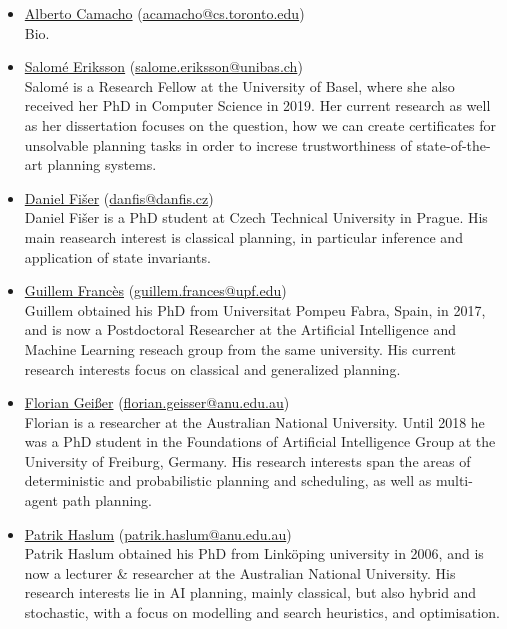 \documentclass[10pt]{article}
\begin{document}
\begin{itemize}

\item \href{http://}{Alberto Camacho}
(\href{mailto:acamacho@cs.toronto.edu}{acamacho@cs.toronto.edu})\\
Bio.

\item \href{http://}{Salom\'{e} Eriksson}
(\href{mailto:salome.eriksson@unibas.ch}{salome.eriksson@unibas.ch})\\
Salom\'{e} is a Research Fellow at the University of Basel, where she also received
her PhD in Computer Science in 2019. Her current research as well as her
dissertation focuses on the question, how we can create certificates for
unsolvable planning tasks in order to increse trustworthiness of
state-of-the-art planning systems.

\item \href{http://}{Daniel Fi\v{s}er}
(\href{mailto:danfis@danfis.cz}{danfis@danfis.cz})\\
Daniel Fi\v{s}er is a PhD student at Czech Technical University in Prague.
His main reasearch interest is classical planning, in particular inference and
application of state invariants.

\item \href{https://www.upf.edu/web/ai-ml/entry/-/-/31934/adscripcion/guillem-franc%C3%A8s}{Guillem Franc\`{e}s}
    (\href{mailto:guillem.frances@upf.edu}{guillem.frances@upf.edu})\\
Guillem obtained his PhD from Universitat Pompeu Fabra, Spain, in 2017, and 
is now a Postdoctoral Researcher at the Artificial Intelligence and Machine
Learning reseach group from the same university.
His current research interests focus on classical and generalized planning.

\item \href{https://cecs.anu.edu.au/people/florian-geisser}{Florian Gei{\ss}er}
(\href{mailto:florian.geisser@anu.edu.au}{florian.geisser@anu.edu.au})\\
Florian is a researcher at the Australian National University. Until 2018 he was
a PhD student in the Foundations of Artificial Intelligence Group at the
University of Freiburg, Germany. His research interests span the areas of
deterministic and probabilistic planning and scheduling, as well as
multi-agent path planning.

\item \href{https://users.cecs.anu.edu.au/~patrik/}{Patrik Haslum}
(\href{mailto:patrik.haslum@anu.edu.au}{patrik.haslum@anu.edu.au})\\
Patrik Haslum obtained his PhD from Link\"oping university in 2006,
and is now a lecturer \& researcher at the Australian National
University. His research interests lie in AI planning, mainly classical,
but also hybrid and stochastic, with a focus on modelling and search
heuristics, and optimisation.


\end{itemize}
\end{document}
